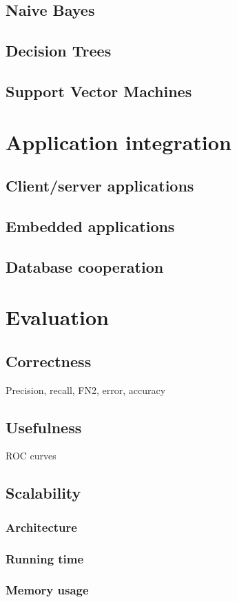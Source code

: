 \documentclass[a4paper]{report}
\begin{document}
\subsection{Naive Bayes}
\subsection{Decision Trees}
\subsection{Support Vector Machines}

\section{Application integration}
\subsection{Client/server applications}
\subsection{Embedded applications}
\subsection{Database cooperation}

\section{Evaluation}
\subsection{Correctness}
Precision, recall, FN2, error, accuracy
\subsection{Usefulness}
ROC curves
\subsection{Scalability}
\subsubsection{Architecture}
\subsubsection{Running time}
\subsubsection{Memory usage}
\end{document}
